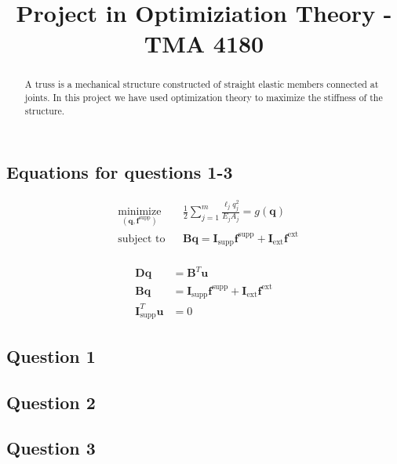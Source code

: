 \documentclass[10pt,a4paper]{article}
\begin{document}
\title{Project in Optimiziation Theory - TMA 4180}
\maketitle

\begin{abstract}
A truss is a mechanical structure constructed of straight elastic members connected at joints. In this project we have used optimization theory to maximize the stiffness of the structure.
\end{abstract}

\subsection*{Equations for questions 1-3}

\begin{equation}
 \begin{aligned}
 \label{eq:system5}
 & \underset{(\bm{q},\bm{f}^{\textrm{supp}})}{\text{minimize}}
 & & \frac{1}{2}\sum_{j=1}^{m}\frac{\ell_{j}q_{j}^{2}}{E_{j}A_{j}} = g(\bm{q}) \\
 & \text{subject to}
 & & \bm{Bq} = \bm{I}_{\textrm{supp}}\bm{f}^{\textrm{supp}} + \bm{I}_{\textrm{ext}}\bm{f}^{\textrm{ext}}
 \end{aligned}
\end{equation}
\\
\begin{equation}
\begin{aligned}
\label{eq:system4}
\bm{Dq} &= \bm{B}^{{T}}\bm{u}\\
\bm{Bq} &= \bm{I}_{\textrm{supp}}\bm{f}^{\textrm{supp}} + \bm{I}_{\textrm{ext}}\bm{f}^{\textrm{ext}}\\
\bm{I}_{\textrm{supp}}^{T}\bm{u} &= 0
\end{aligned}
\end{equation}


\subsection*{Question 1}



\subsection*{Question 2}



\subsection*{Question 3}

\end{document}
